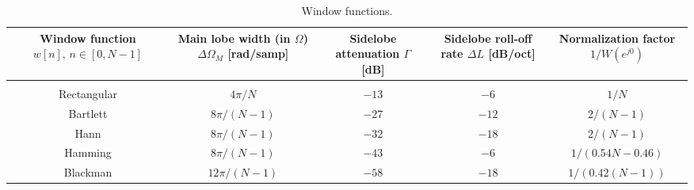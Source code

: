 \documentclass{report}
\begin{document}
\begin{table}[!hbt]
    \centering
    \caption{Window functions.}
    \label{window}
    \begin{tabular}{|c|c|c|c|c|}
        \hline
        \Centerstack{Window function\\$w[n],\,n\in[0,N-1]$} & \Centerstack{Main lobe width (in $\Omega$)\\$\Delta\Omega_M$ [rad/samp]} & \Centerstack{Sidelobe\\attenuation\\$\Gamma$ [dB]} & \Centerstack{Sidelobe\\roll-off rate\\$\Delta L$ [dB/oct]} & \Centerstack{Normalization\\factor\\$1/W(e^{j0})$} \\[0.15cm]
        \hline
        & & & & \\
        Rectangular & $4\pi/N$ & $-13$ & $-6$ & $1/N$ \\[0.5cm]
        Bartlett & $8\pi/(N-1)$ & $-27$ & $-12$ & $2/(N-1)$ \\[0.5cm]
        Hann & $8\pi/(N-1)$ & $-32$ & $-18$ & $2/(N-1)$ \\[0.5cm]
        Hamming & $8\pi/(N-1)$ & $-43$ & $-6$ & $1/(0.54N-0.46)$\\[0.5cm]
        Blackman & $12\pi/(N-1)$ & $-58$ & $-18$ & $1/(0.42(N-1))$ \\[0.5cm]
        \hline
    \end{tabular}
\end{table}
\end{document}
